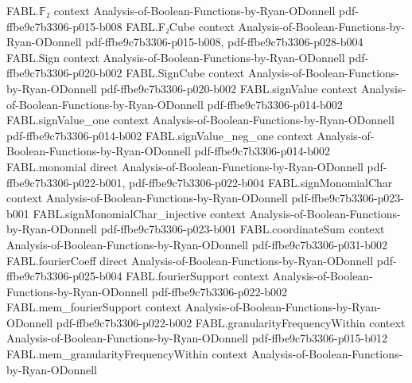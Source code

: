 \begin{theorem}
\label{FABL.equation_7_1}
\leanok
{}
\proofstep
  {FABL.𝔽₂}
  {context}
  {Analysis-of-Boolean-Functions-by-Ryan-ODonnell}
  {pdf-ffbe9c7b3306-p015-b008}
\proofstep
  {FABL.F₂Cube}
  {context}
  {Analysis-of-Boolean-Functions-by-Ryan-ODonnell}
  {pdf-ffbe9c7b3306-p015-b008,
    pdf-ffbe9c7b3306-p028-b004}
\proofstep
  {FABL.Sign}
  {context}
  {Analysis-of-Boolean-Functions-by-Ryan-ODonnell}
  {pdf-ffbe9c7b3306-p020-b002}
\proofstep
  {FABL.SignCube}
  {context}
  {Analysis-of-Boolean-Functions-by-Ryan-ODonnell}
  {pdf-ffbe9c7b3306-p020-b002}
\proofstep
  {FABL.signValue}
  {context}
  {Analysis-of-Boolean-Functions-by-Ryan-ODonnell}
  {pdf-ffbe9c7b3306-p014-b002}
\proofstep
  {FABL.signValue_one}
  {context}
  {Analysis-of-Boolean-Functions-by-Ryan-ODonnell}
  {pdf-ffbe9c7b3306-p014-b002}
\proofstep
  {FABL.signValue_neg_one}
  {context}
  {Analysis-of-Boolean-Functions-by-Ryan-ODonnell}
  {pdf-ffbe9c7b3306-p014-b002}
\proofstep
  {FABL.monomial}
  {direct}
  {Analysis-of-Boolean-Functions-by-Ryan-ODonnell}
  {pdf-ffbe9c7b3306-p022-b001,
    pdf-ffbe9c7b3306-p022-b004}
\proofstep
  {FABL.signMonomialChar}
  {context}
  {Analysis-of-Boolean-Functions-by-Ryan-ODonnell}
  {pdf-ffbe9c7b3306-p023-b001}
\proofstep
  {FABL.signMonomialChar_injective}
  {context}
  {Analysis-of-Boolean-Functions-by-Ryan-ODonnell}
  {pdf-ffbe9c7b3306-p023-b001}
\proofstep
  {FABL.coordinateSum}
  {context}
  {Analysis-of-Boolean-Functions-by-Ryan-ODonnell}
  {pdf-ffbe9c7b3306-p031-b002}
\proofstep
  {FABL.fourierCoeff}
  {direct}
  {Analysis-of-Boolean-Functions-by-Ryan-ODonnell}
  {pdf-ffbe9c7b3306-p025-b004}
\proofstep
  {FABL.fourierSupport}
  {context}
  {Analysis-of-Boolean-Functions-by-Ryan-ODonnell}
  {pdf-ffbe9c7b3306-p022-b002}
\proofstep
  {FABL.mem_fourierSupport}
  {context}
  {Analysis-of-Boolean-Functions-by-Ryan-ODonnell}
  {pdf-ffbe9c7b3306-p022-b002}
\proofstep
  {FABL.granularityFrequencyWithin}
  {context}
  {Analysis-of-Boolean-Functions-by-Ryan-ODonnell}
  {pdf-ffbe9c7b3306-p015-b012}
\proofstep
  {FABL.mem_granularityFrequencyWithin}
  {context}
  {Analysis-of-Boolean-Functions-by-Ryan-ODonnell}

\end{theorem}
